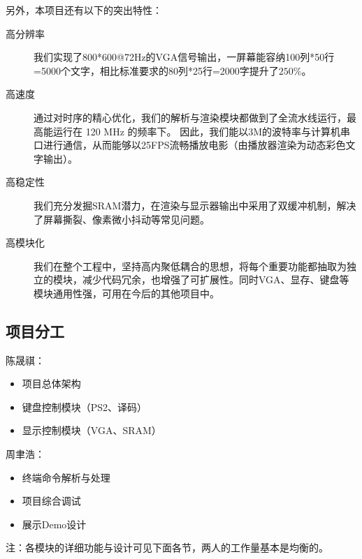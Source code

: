 另外，本项目还有以下的突出特性：
\begin{description}
    \item[高分辨率] 我们实现了800*600@72Hz的VGA信号输出，一屏幕能容纳100列*50行=5000个文字，相比标准要求的80列*25行=2000字提升了$250\%$。
    \item[高速度] 通过对时序的精心优化，我们的解析与渲染模块都做到了全流水线运行，最高能运行在 120 MHz 的频率下。
    因此，我们能以3M的波特率与计算机串口进行通信，从而能够以25FPS流畅播放电影（由播放器渲染为动态彩色文字输出）。
    \item[高稳定性] 我们充分发掘SRAM潜力，在渲染与显示器输出中采用了双缓冲机制，解决了屏幕撕裂、像素微小抖动等常见问题。
    \item[高模块化] 我们在整个工程中，坚持高内聚低耦合的思想，将每个重要功能都抽取为独立的模块，减少代码冗余，也增强了可扩展性。同时VGA、显存、键盘等模块通用性强，可用在今后的其他项目中。
\end{description}


\subsection{项目分工}
\begin{minipage}[t]{0.45\textwidth}
陈晟祺：
\begin{itemize}
    \item 项目总体架构
    \item 键盘控制模块（PS2、译码）
    \item 显示控制模块（VGA、SRAM）
\end{itemize}
\end{minipage}
\begin{minipage}[t]{0.45\textwidth}
周聿浩：
\begin{itemize}
    \item 终端命令解析与处理
    \item 项目综合调试
    \item 展示Demo设计
\end{itemize}
\end{minipage}

\vspace{1em}
注：各模块的详细功能与设计可见下面各节，两人的工作量基本是均衡的。